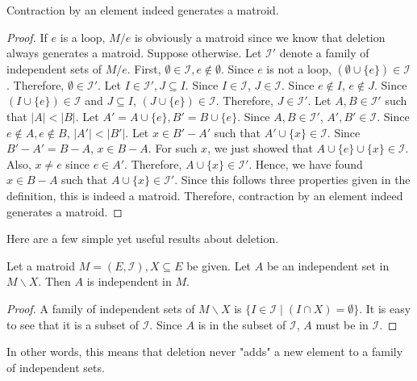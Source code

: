 \begin{thm}
Contraction by an element indeed generates a matroid.
\end{thm}

\begin{proof}
If $e$ is a loop, $M / e$ is obviously a matroid since we know that deletion always generates a matroid.
Suppose otherwise.
Let $\mathcal{I}'$ denote a family of independent sets of $M / e$.
First, $\emptyset \in \mathcal{I}, e \notin \emptyset$. Since $e$ is not a loop, $(\emptyset \cup \{ e \}) \in \mathcal{I}$.
Therefore, $\emptyset \in \mathcal{I}'$.
Let $I \in \mathcal{I}', J \subseteq I$.
Since $I \in \mathcal{I}$, $J \in \mathcal{I}$.
Since $e \notin I$, $e \notin J$.
Since $(I \cup \{ e \}) \in \mathcal{I}$ and $J \subseteq I$, $(J \cup \{ e \}) \in \mathcal{I}$.
Therefore, $J \in \mathcal{I}'$.
Let $A, B \in \mathcal{I}'$ such that $\lvert A \rvert < \lvert B \rvert$.
Let $A' = A \cup \{ e \}, B' = B \cup \{ e \}$.
Since $A, B \in \mathcal{I}'$, $A', B' \in \mathcal{I}$.
Since $e \notin A, e \notin B$, $\lvert A' \rvert < \lvert B' \rvert$.
Let $x \in B' - A'$ such that $A' \cup \{ x \} \in \mathcal{I}$.
Since $B' - A' = B - A$, $x \in B - A$.
For such $x$, we just showed that $A \cup \{ e \} \cup \{ x \} \in \mathcal{I}$.
Also, $x \neq e$ since $e \in A'$.
Therefore, $A \cup \{ x \} \in \mathcal{I}'$. 
Hence, we have found $x \in B - A$ such that $A \cup \{ x \} \in \mathcal{I}'$.
Since this follows three properties given in the definition, this is indeed a matroid.
Therefore, contraction by an element indeed generates a matroid.
\end{proof}


Here are a few simple yet useful results about deletion.

\begin{thm}
Let a matroid $M = (E, \mathcal{I}), X \subseteq E$ be given.
Let $A$ be an independent set in $M \backslash X$.
Then $A$ is independent in $M$.
\end{thm}

\begin{proof}
A family of independent sets of $M \backslash X$ is $\{ I \in \mathcal{I} \mid (I \cap X) = \emptyset \}$.
It is easy to see that it is a subset of $\mathcal{I}$.
Since $A$ is in the subset of $\mathcal{I}$, $A$ must be in $\mathcal{I}$.
\end{proof}

In other words, this means that deletion never "adds" a new element to a family of independent sets.



